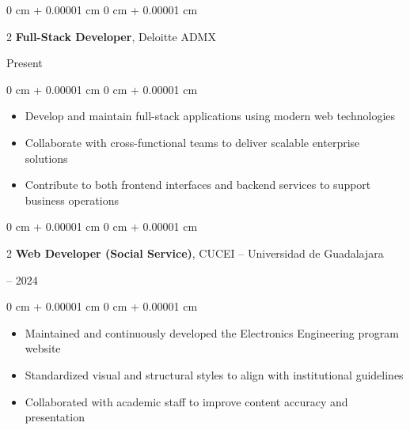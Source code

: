 \documentclass[10pt, letterpaper]{article}
\newenvironment{highlights}{
  \begin{itemize}[
        topsep=0.10 cm,
        parsep=0.10 cm,
        partopsep=0pt,
        itemsep=0pt,
        leftmargin=0 cm + 10pt
      ]
    }{
  \end{itemize}
} %
\newenvironment{onecolentry}{
  \begin{adjustwidth}{
      0 cm + 0.00001 cm
    }{
      0 cm + 0.00001 cm
    }
  }{
  \end{adjustwidth}
} %
\newenvironment{twocolentry}[2][]{
  \onecolentry
  \def\secondColumn{#2}
  \setcolumnwidth{\fill, 4.5 cm}
  \begin{paracol}{2}
  }{
    \switchcolumn \raggedleft \secondColumn
  \end{paracol}
  \endonecolentry
} %
\begin{document}
\begin{twocolentry}{ Present } \textbf{Full-Stack Developer}, Deloitte ADMX
\end{twocolentry} \vspace{0.10 cm}
\begin{onecolentry}
  \begin{highlights}
    \item Develop and maintain full-stack applications using modern web technologies
    \item Collaborate with cross-functional teams to deliver scalable enterprise solutions
    \item Contribute to both frontend interfaces and backend services to support business operations
  \end{highlights}
\end{onecolentry} \vspace{0.2 cm}

\begin{twocolentry}{ 2023 -- 2024 } \textbf{Web Developer (Social Service)}, CUCEI – Universidad de Guadalajara
\end{twocolentry} \vspace{0.10 cm}
\begin{onecolentry}
  \begin{highlights}
    \item Maintained and continuously developed the Electronics Engineering program website
    \item Standardized visual and structural styles to align with institutional guidelines
    \item Collaborated with academic staff to improve content accuracy and presentation
  \end{highlights}
\end{onecolentry} \vspace{0.2 cm}
\end{document}
